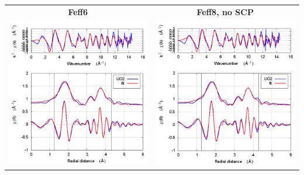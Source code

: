 \documentclass[11pt]{article}
\begin{document}
\begin{center}
  \begin{tabular}{cc}
    \textbf{Feff6} & \textbf{Feff8, no SCP} \\ 
    \includegraphics[width=.45\linewidth]{UO2/scf/fit_feff6.png} & 
    \includegraphics[width=.45\linewidth]{UO2/scf/fit_noSCF.png} \\
  \end{tabular}
\end{center}
\end{document}
